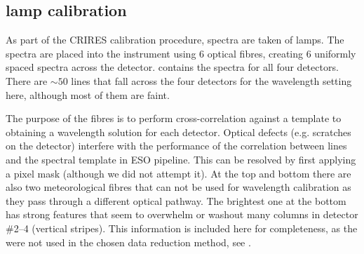 \subsection{\thar{} lamp calibration}
\label{subsec:th-ar}
As part of the {CRIRES} calibration procedure, spectra are taken of \thar{} lamps. The \thar{} spectra are placed into the instrument using 6 optical fibres, creating 6 uniformly spaced spectra across the detector.
 contains the \thar{} spectra for all four detectors. There are \(\sim50\) \thar{} lines that fall across the four detectors for the wavelength setting here, although most of them are faint.

The purpose of the \thar{} fibres is to perform cross-correlation against a \thar{} template to obtaining a wavelength solution for each detector. Optical defects (e.g. scratches on the detector) interfere with the performance of the correlation between \thar{} lines and the spectral template in {ESO} pipeline. This can be resolved by first applying a pixel mask (although we did not attempt it). At the top and bottom there are also two meteorological fibres that can not be used for wavelength calibration as they pass through a different optical pathway. The brightest one at the bottom has strong features that seem to overwhelm or washout many columns in detector \#2--4 (vertical stripes). 
This information is included here for completeness, as the \thar{} were not used in the chosen data reduction method, see .


